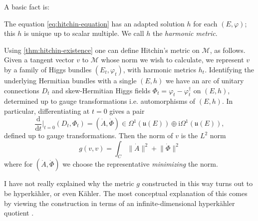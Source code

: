 \documentclass[12pt,letterpaper,reqno]{article}
\numberwithin{equation}{section}
\newcommand{\fu}{{\mathfrak u}}
\newcommand{\cM}{\ensuremath{\mathcal M}}
\newcommand{\kahler}{K\"ahler\xspace}
\newcommand{\hk}{hyperk\"ahler\xspace}
\newcommand{\Hk}{Hyperk\"ahler\xspace}
\newcommand{\I}{{\mathrm i}}
\newcommand{\de}{\mathrm{d}}
\newcommand{\norm}[1]{\lVert#1\rVert}
\newcommand{\ti}[1]{\textit{#1}}
\newcommand{\fixme}[1]{{\color{orange}{[#1]}}}
\begin{document}
A basic fact is: \fixme{refs: Simpson}
\begin{thm} \label{thm:hitchin-existence}
The equation \eqref{eq:hitchin-equation} has an
adapted solution $h$ for each $(E,\varphi)$;
this $h$ is unique up to scalar multiple.
We call $h$ the \ti{harmonic metric}.
\end{thm}

Using \autoref{thm:hitchin-existence}
one can define Hitchin's metric on $\cM$, as follows.
Given a tangent vector $v$ to $\cM$ whose norm we wish to calculate, we represent $v$ by a family of Higgs bundles
$(E_t,\varphi_t)$, with harmonic metrics $h_t$.
Identifying the underlying Hermitian bundles with a single $(E,h)$
we have an arc of unitary connections $D_t$ and skew-Hermitian 
Higgs fields $\Phi_t = \varphi_t - \varphi_t^\dagger$ 
on $(E,h)$, determined up to gauge transformations i.e. 
automorphisms of $(E,h)$.
In particular, differentiating at $t = 0$ gives a pair
\begin{equation}
\frac{\de}{\de t}\Bigg\rvert_{t=0} (D_t, \Phi_t) = 
(\dot A, \dot \Phi) \in \Omega^1(\fu(E)) \oplus \I \Omega^{1}(\fu(E)),
\end{equation}
defined up to gauge transformations.
Then the norm of $v$ is the $L^2$ norm
\begin{equation}
  g(v,v) = \int_C \norm{\dot A}^2 + \norm{\dot \Phi}^2
\end{equation}
where for $(\dot A, \dot \Phi)$ we choose the representative
\ti{minimizing} the norm.

\begin{remark}[\Hk quotient] I have not really explained
why the metric $g$ constructed in this way turns out to 
be \hk, or even \kahler. The most conceptual explanation
of this comes by viewing the construction in terms of 
an infinite-dimensional \hk quotient \fixme{cite Hitchin}.
\end{remark}

\end{document}
